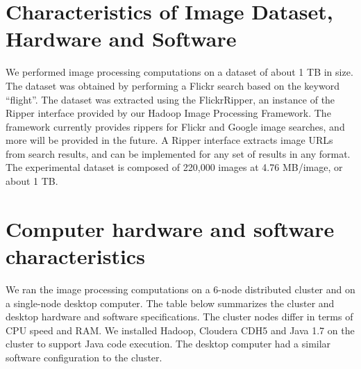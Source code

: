 

\section{Characteristics of Image Dataset, Hardware and Software}
We performed image processing computations on a dataset of about 1 TB
in size. The dataset was obtained by performing a Flickr search based
on the keyword ``flight''.  The dataset was extracted using the
FlickrRipper, an instance of the Ripper interface provided by our
Hadoop Image Processing Framework.  The framework currently provides
rippers for Flickr and Google image searches, and more will be
provided in the future.  A Ripper interface extracts image URLs from
search results, and can be implemented for any set of results in any
format.  The experimental dataset is composed of 220,000 images at 4.76
MB/image, or about 1 TB.

\section{Computer hardware and software characteristics}
We ran the image processing computations on a 6-node distributed
cluster and on a single-node desktop computer. The table below
summarizes the cluster and desktop hardware and software
specifications. The cluster nodes differ in terms of CPU speed and
RAM. We installed Hadoop, Cloudera CDH5 and Java 1.7 on the cluster to
support Java code execution. The desktop computer had a similar
software configuration to the cluster.

